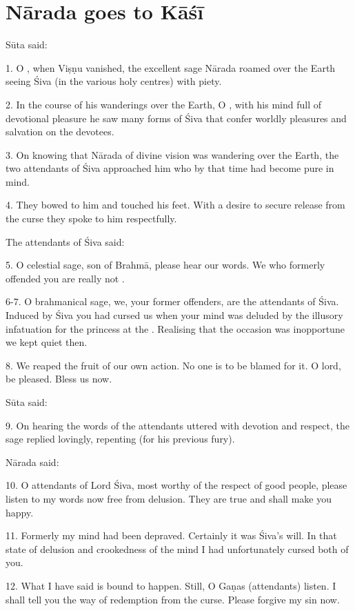 \chapter{Nārada goes to Kāśī}

Sūta said:

1. O , when Viṣṇu vanished, the excellent sage Nārada roamed over
the Earth seeing Śiva  (in the various holy centres) with piety.

2. In the course of his wanderings over the Earth, O , with his
mind full of devotional pleasure he saw many forms of Śiva that confer worldly
pleasures and salvation on the devotees.

3. On knowing that Nārada of divine vision was wandering over the Earth, the two
attendants of Śiva approached him who by that time had become pure in mind.

4. They bowed to him and touched his feet. With a desire to secure release from
the curse they spoke to him respectfully.

The attendants of Śiva said:

5. O celestial sage, son of Brahmā, please hear our words. We who formerly
offended you are really not .

6-7. O brahmanical sage, we, your former offenders, are the attendants of Śiva.
Induced by Śiva you had cursed us when your mind was deluded by the illusory
infatuation for the princess at the . Realising that the occasion
was inopportune we kept quiet then.

8. We reaped the fruit of our own action. No one is to be blamed for it. O lord,
be pleased. Bless us now.

Sūta said:

9. On hearing the words of the attendants uttered with devotion and respect,
the sage replied lovingly, repenting (for his previous fury).

Nārada said:

10. O attendants of Lord Śiva, most worthy of the respect of good people, please
listen to my words now free from delusion. They are true and shall make you
happy.

11. Formerly my mind had been depraved. Certainly it was Śiva’s will. In that
state of delusion and crookedness of the mind I had unfortunately cursed both
of you.

12. What I have said is bound to happen. Still, O Gaṇas (attendants) listen. I
shall tell you the way of redemption from the curse. Please forgive my sin now.

